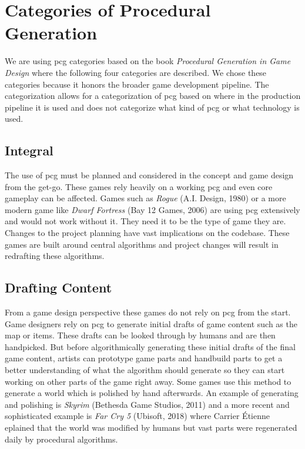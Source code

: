 \documentclass[10pt,a4paper]{article}
\begin{document}
\section{Categories of Procedural Generation}\label{sec:categories}
\begin{multicols}{2}
We are using \gls{pcg} categories based on the book \textit{Procedural Generation in Game Design}\citep[p.~3]{Short:2017:PGG:3161477} where the following four categories are described. We chose these categories because it honors the broader game development pipeline. The categorization allows for a categorization of \gls{pcg} based on where in the production pipeline it is used and does not categorize what kind of \gls{pcg} or what technology is used.
\end{multicols}
\subsection{Integral}
\begin{multicols}{2} The use of \gls{pcg} must be planned and considered in the concept and game design from the get-go. These games rely heavily on a working \gls{pcg} and even core gameplay can be affected. Games such as \textit{Rogue} (A.I. Design, 1980) or a more modern game like \textit{Dwarf Fortress} (Bay 12 Games, 2006) are using \gls{pcg} extensively and would not work without it. They need it to be the type of game they are. Changes to the project planning have vast implications on the codebase. These games are built around central algorithms and project changes will result in redrafting these algorithms.
\end{multicols}
\subsection{Drafting Content}
\begin{multicols}{2} From a game design perspective these games do not rely on \gls{pcg} from the start. Game designers rely on \gls{pcg} to generate initial drafts of game content such as the map or items. These drafts can be looked through by humans and are then handpicked. But before algorithmically generating these initial drafts of the final game content, artists can prototype game parts and handbuild parts to get a better understanding of what the algorithm should generate so they can start working on other parts of the game right away. Some games use this method to generate a world which is polished by hand afterwards. An example of generating and polishing is \textit{Skyrim} (Bethesda Game Studios, 2011) and a more recent and sophisticated example is \textit{Far Cry 5} (Ubisoft, 2018) where Carrier Étienne eplained that the world was modified by humans but vast parts were regenerated daily by procedural algorithms\cite{Carrier2018}.
\end{multicols}
\end{document}
